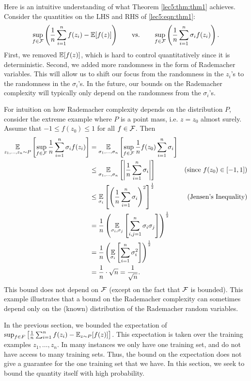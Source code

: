 Here is an intuitive understanding of what Theorem \ref{lec5:thm:thm1} achieves. Consider the quantities on the LHS and RHS of \eqref{lec5:eqn:thm1}:
\begin{align*}
    \sup_{f\in \mathcal F} \left(\frac{1}{n} \sum_{i=1}^n f(z_i) - \operatorname*{\mathbb{E}}[f(z)]\right) \qquad \text{vs.} \qquad \sup_{f\in \mathcal F} \left(\frac{1}{n} \sum_{i=1}^n \sigma_i f(z_i)\right).
\end{align*}
First, we removed $\operatorname*{\mathbb{E}}[f(z)]$, which is hard to control quantitatively since it is deterministic. Second, we added more randomness in the form of Rademacher variables. This will allow us to shift our focus from the randomness in the $z_i$'s to the randomness in the $\sigma_i$'s. In the future, our bounds on the Rademacher complexity will typically only depend on the randomness from the $\sigma_i$'s.

For intuition on how Rademacher complexity depends on the distribution $P$, consider the extreme example where $P$ is a point mass, i.e. $z = z_0$ almost surely. Assume that $-1 \leq f(z_0) \leq 1$ for all $f \in \mathcal F$. Then
\begin{align}
    \operatorname*{\mathbb{E}}_{z_1, \dots, z_n \sim P} \left[ \sup_{f \in \mathcal F} \frac{1}{n} \sum^n_{i=1} \sigma_i f(z_i)\right]
    &= \operatorname*{\mathbb{E}}_{\sigma_1, \dots, \sigma_n} \left[ \sup_{f \in \mathcal F} \frac{1}{n}f(z_0) \sum^n_{i=1} \sigma_i \right] \\
    &\leq \operatorname*{\mathbb{E}}_{\sigma_1, \dots, \sigma_n} \left[ \left| \frac{1}{n} \sum^n_{i=1} \sigma_i \right|\right] &(\text{since } f(z_0) \in [-1,1]) \\
    &\leq \operatorname*{\mathbb{E}}_{\sigma_i} \left[ \left( \frac{1}{n} \sum^n_{i=1} \sigma_i \right)^2\right]^\frac{1}{2} &(\text{Jensen's Inequality}) \\
    &= \frac{1}{n}\left( \operatorname*{\mathbb{E}}_{\sigma_i, \sigma_j} \left[ \sum^n_{i, j=1} \sigma_i\sigma_j \right] \right)^\frac{1}{2}\\
    &= \frac{1}{n}\left( \operatorname*{\mathbb{E}}_{\sigma_i} \left[ \sum^n_{i=1} \sigma_i^2 \right] \right)^\frac{1}{2} \\
    &= \frac{1}{n} \cdot \sqrt{n} = \frac{1}{\sqrt{n}}.
\end{align}
This bound does not depend on $\mathcal F$ (except on the fact that $\mathcal F$ is bounded). This example illustrates that a bound on the Rademacher complexity can sometimes depend only on the (known) distribution of the Rademacher random variables.


In the previous section, we bounded the expectation of $\sup_{f\in F} \left[ \frac{1}{n} \sum^n_{i=1} f(z_i) -  \operatorname*{\mathbb{E}}_{z\sim P} [f(z)] \right]$. This expectation is taken over the training examples $z_1, \dots, z_n$. In many instances we only have one training set, and do not have access to many training sets. Thus, the bound on the expectation does not give a guarantee for the one training set that we have. In this section, we seek to bound the quantity itself with high probability.

